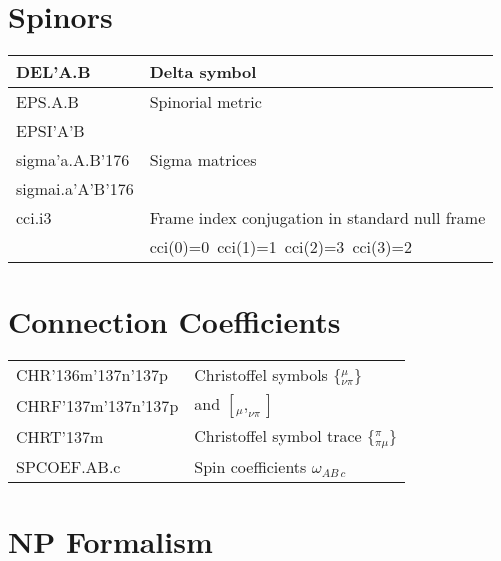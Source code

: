 \documentclass[twoside,openright]{report}
\newcommand{\grgtt}{\ttfamily}
\renewcommand{\tt}{\grgtt}
\def\^{{\tt \char'136}}                     %
\def\_{{\tt \char'137}}                     %
\newcommand{\cc}{{\tt \char'176}}           %
\begin{document}
\begin{center}
\section{Spinors}

\begin{tabular}{|l|l|}
\hline
\tt  DEL'A.B      & Delta symbol          \\
\hline
\tt  EPS.A.B      & Spinorial metric      \\
\tt  EPSI'A'B     &                       \\
\hline
\tt  sigma'a.A.B\cc   & Sigma matrices      \\
\tt  sigmai.a'A'B\cc  &                    \\
\hline
\tt  cci.i3    & Frame index conjugation in standard null frame \\
	       & {\tt cci(0)=0}\ {\tt cci(1)=1}\ {\tt cci(2)=3}\ {\tt cci(3)=2} \\
\hline
\end{tabular}

\section{Connection Coefficients}

\begin{tabular}{|l|l|}
\hline
\tt  CHR\^m\_n\_p  &  Christoffel symbols $\{{}^\mu_{\nu\pi}\}$ \\
\tt  CHRF\_m\_n\_p &  and $[{}_{\mu},_{\nu\pi}]$  \\
\tt  CHRT\_m       &  Christoffel symbol trace $\{{}^\pi_{\pi\mu}\}$  \\
\hline
\tt  SPCOEF.AB.c     & Spin coefficients $\omega_{AB\,c}$  \\
\hline
\end{tabular}

\section{NP Formalism}


\end{center}
\end{document}
